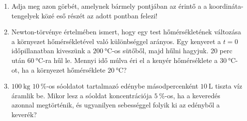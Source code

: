 \documentclass{szb-practice}
\begin{document}
\begin{enumerate}
  \item Adja meg azon görbét, amelynek bármely pontjában az érintő a
        a koordináta-ten\-ge\-lyek közé eső részét az adott pontban felezi!

  \item Newton-törvénye értelmében ismert, hogy egy test hőmérsékletének
        változása a környezet hőmérsékletével való különbséggel arányos.
        Egy kenyeret a $t = 0$ időpillanatban kiveszünk a
        $\SI{200}{\degreeCelsius}$-os sütőből, majd hűlni hagyjuk. 20 perc
        után $\SI{60}{\degreeCelsius}$-ra hűl le. Mennyi idő múlva éri el a
        kenyér hőmérséklete a $\SI{30}{\degreeCelsius}$-ot, ha a környezet
        hőmérséklete $\SI{20}{\degreeCelsius}$?

  \item $\SI{100}{\kilogram}$ $\SI{10}{\percent}$-os sóoldatot tartalmazó
        edénybe másodpercenként $\SI{10}{\liter}$ tiszta víz áramlik be.
        Mikor lesz a sóoldat koncentrációja $\SI{5}{\percent}$-os, ha a
        keveredés azonnal megtörténik, és ugyanilyen sebességgel folyik ki az
        edényből a keverék?
\end{enumerate}
\end{document}

